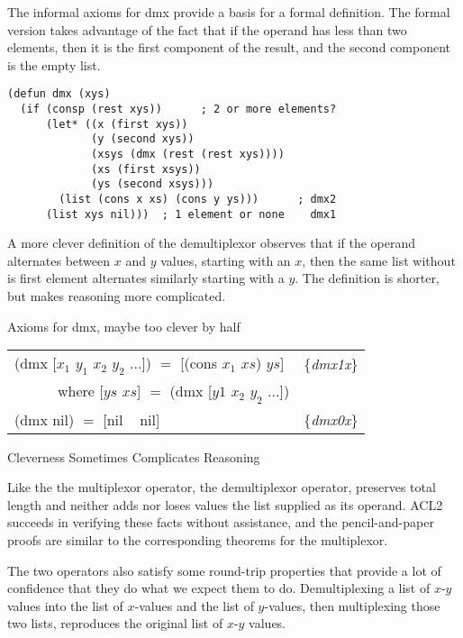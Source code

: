 The informal axioms for dmx provide a basis for a formal definition.
The formal version takes advantage of the fact that if the operand
has less than two elements, then it is the first component of the result,
and the second component is the empty list.

\label{dmx-defun}
\begin{Verbatim}
(defun dmx (xys)
  (if (consp (rest xys))      ; 2 or more elements?
      (let* ((x (first xys))
             (y (second xys))
             (xsys (dmx (rest (rest xys))))
             (xs (first xsys))
             (ys (second xsys)))
        (list (cons x xs) (cons y ys)))      ; dmx2
      (list xys nil)))  ; 1 element or none    dmx1
\end{Verbatim}

\begin{aside}
A more clever definition of the demultiplexor
observes that if the operand alternates between $x$ and $y$ values,
starting with an $x$,
then the same list without is first element alternates similarly
starting with a $y$. The definition is shorter,
but makes reasoning more complicated.
\begin{center}
Axioms for dmx, maybe too clever by half
\begin{tabular}{ll}
(dmx [$x_1$ $y_1$ $x_2$ $y_2$ $\dots$]) $=$ [(cons $x_1$ $xs$) $ys$]  & \{\emph{dmx1x}\} \\
~~~~~~where [$ys$ $xs$] $=$ (dmx [$y1$ $x_2$ $y_2$ $\dots$])          & \\
(dmx nil) $=$ [nil ~ nil]                                             & \{\emph{dmx0x}\} \\
\end{tabular}
\end{center}
\caption{Cleverness Sometimes Complicates Reasoning}
\label{aside:dmx-defun-trick}
\end{aside}

Like the the multiplexor operator,
the demultiplexor operator, preserves total length
and neither adds nor loses values the list supplied as its operand.
ACL2 succeeds in verifying these facts without assistance,
and the pencil-and-paper proofs are similar to the corresponding
theorems for the multiplexor.

The two operators also satisfy some round-trip properties
that provide a lot of confidence that they do what we expect them to do.
Demultiplexing a list of $x$-$y$ values into the list of
$x$-values and the list of $y$-values, then multiplexing
those two lists, reproduces the original list of $x$-$y$ values.

